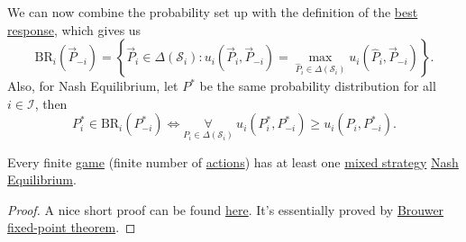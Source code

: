 We can now combine the probability set up with the definition of the \hyperref[def:best-response]{best response}, which gives us
\[
	\mathrm{BR}_{i}(\overrightarrow{P}_{-i}) = \left\{\overrightarrow{P}_i\in \Delta(\mathcal{S}_i)\colon u_{i}(\overrightarrow{P}_i, \overrightarrow{P}_{-i}) = \max_{\hat{P}_i\in \Delta(\mathcal{S}_i)}u_{i}(\hat{P}_i, \overrightarrow{P}_{-i})\right\}.
\]
Also, for Nash Equilibrium, let \(P^{\ast}\) be the same probability distribution for all \(i\in \mathcal{I} \), then
\[
	P^{\ast}_i\in\mathrm{BR}_i(P^{\ast}_{-i})\iff \underset{P_{i}\in \Delta(\mathcal{S}_i)}{\forall }\ u_{i}(P^{\ast}_i, P^{\ast}_{-i})\geq u_{i}(P_{i}, P^{\ast}_{-i}).
\]

\begin{theorem}\label{thm:Nash-existence-theorem}
	Every finite \hyperref[def:mathematical-game]{game} (finite number of \hyperref[def:strategy]{actions}) has at least one \hyperref[def:mixed-strategy]{mixed strategy} \hyperref[def:Nash-equilibrium]{Nash Equilibrium}.
\end{theorem}
\begin{proof}
	A nice short proof can be found \href{https://www.cs.ubc.ca/~kevinlb/papers/TR-2007-25.pdf}{here}. It's essentially proved by \href{https://en.wikipedia.org/wiki/Brouwer_fixed-point_theorem}{Brouwer fixed-point theorem}.
\end{proof}